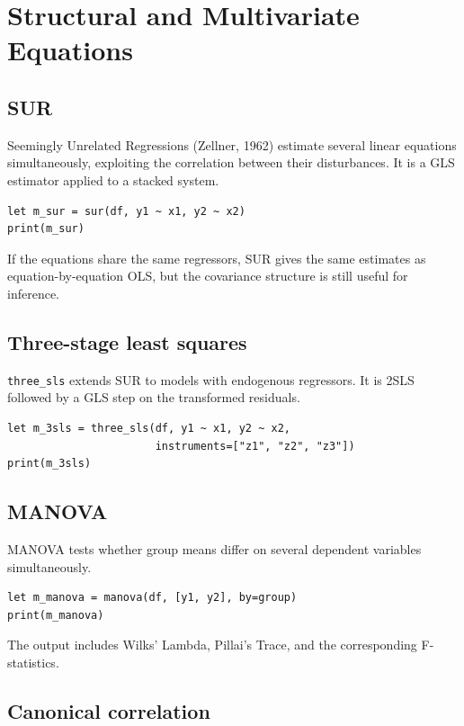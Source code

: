 \chapter{Structural and Multivariate Equations}

\section{SUR}

Seemingly Unrelated Regressions (Zellner, 1962) estimate several linear
equations simultaneously, exploiting the correlation between their
disturbances. It is a GLS estimator applied to a stacked system.

\begin{lstlisting}[caption={SUR}]
let m_sur = sur(df, y1 ~ x1, y2 ~ x2)
print(m_sur)
\end{lstlisting}

If the equations share the same regressors, SUR gives the same estimates
as equation-by-equation OLS, but the covariance structure is still
useful for inference.

\section{Three-stage least squares}

\texttt{three\_sls} extends SUR to models with endogenous regressors. It is 2SLS
followed by a GLS step on the transformed residuals.

\begin{lstlisting}[caption={3SLS}]
let m_3sls = three_sls(df, y1 ~ x1, y2 ~ x2,
                       instruments=["z1", "z2", "z3"])
print(m_3sls)
\end{lstlisting}

\section{MANOVA}

MANOVA tests whether group means differ on several dependent variables
simultaneously.

\begin{lstlisting}[caption={MANOVA}]
let m_manova = manova(df, [y1, y2], by=group)
print(m_manova)
\end{lstlisting}

The output includes Wilks' Lambda, Pillai's Trace, and the corresponding
F-statistics.

\section{Canonical correlation}

